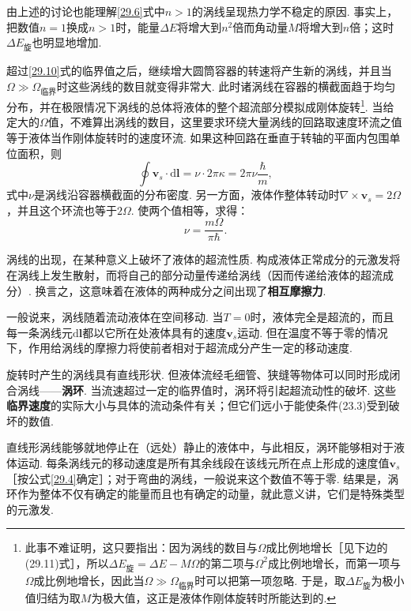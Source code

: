 由上述的讨论也能理解\eqref{29.6}式中$n>1$的涡线呈现热力学不稳定的原因. 事实上，把数值$n=1$换成$n>1$时，能量$\Delta E$将增大到$n^{2}$倍而角动量$M$将增大到$n$倍；这时$\Delta E_{\text{旋}}$也明显地增加.

超过\eqref{29.10}式的临界值之后，继续增大圆筒容器的转速将产生新的涡线，并且当$\varOmega\gg\varOmega_{\text{临界}}$时这些涡线的数目就变得非常大. 此时诸涡线在容器的横截面趋于均匀分布，并在极限情况下涡线的总体将液体的整个超流部分模拟成刚体旋转\footnote{此事不难证明，这只要指出：因为涡线的数目与$\varOmega$成比例地增长［见下边的(29.11)式］，所以$\Delta E_{\text{旋}}=\Delta E-M\varOmega$的第二项与$\varOmega^{2}$成比例地增长，而第一项与$\varOmega$成比例地增长，因此当$\varOmega\gg\varOmega_{\text{临界}}$时可以把第一项忽略. 于是，取$\Delta E_{\text{旋}}$为极小值归结为取$M$为极大值，这正是液体作刚体旋转时所能达到的.}. 当给定大的$\varOmega$值，不难算出涡线的数目，这里要求环绕大量涡线的回路取速度环流之值等于液体当作刚体旋转时的速度环流. 如果这种回路在垂直于转轴的平面内包围单位面积，则
\begin{equation*}
\oint\bm{v}_{s}\cdot\mathrm{d}\bm{l}=\nu\cdot2\pi\kappa=2\pi\nu\frac{\hbar}{m},
\end{equation*}
式中$\nu$是涡线沿容器横截面的分布密度. 另一方面，液体作整体转动时$\nabla\times\bm{v}_{s}=2\bm{\varOmega}$，并且这个环流也等于$2\bm{\varOmega}$. 使两个值相等，求得：
\begin{equation}
\nu=\frac{m\varOmega}{\pi\hbar}.
\label{29.11}
\end{equation}

涡线的出现，在某种意义上破坏了液体的超流性质. 构成液体正常成分的元激发将在涡线上发生散射，而将自己的部分动量传递给涡线（因而传递给液体的超流成分）. 换言之，这意味着在液体的两种成分之间出现了\textbf{相互摩擦力}.

一般说来，涡线随着流动液体在空间移动. 当$T=0$时，液体完全是超流的，而且每一条涡线元$\mathrm{d}\bm{l}$都以它所在处液体具有的速度$\bm{v}_{s}$运动. 但在温度不等于零的情况下，作用给涡线的摩擦力将使前者相对于超流成分产生一定的移动速度.

旋转时产生的涡线具有直线形状. 但液体流经毛细管、狭缝等物体可以同时形成闭合涡线——\textbf{涡环}. 当流速超过一定的临界值时，涡环将引起超流动性的破坏. 这些\textbf{临界速度}的实际大小与具体的流动条件有关；但它们远小于能使条件(23.3)受到破坏的数值.

直线形涡线能够就地停止在（远处）静止的液体中，与此相反，涡环能够相对于液体运动. 每条涡线元的移动速度是所有其余线段在该线元所在点上形成的速度值$\bm{v}_{s}$［按公式\eqref{29.4}确定］；对于弯曲的涡线，一般说来这个数值不等于零. 结果是，涡环作为整体不仅有确定的能量而且也有确定的动量，就此意义讲，它们是特殊类型的元激发.


